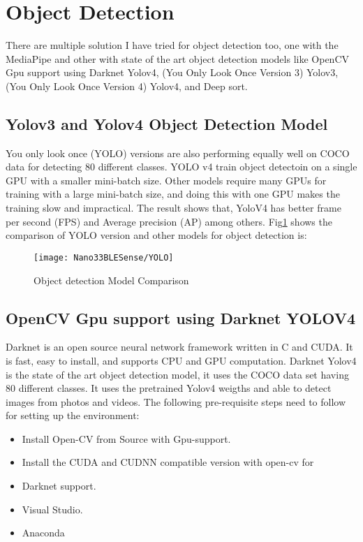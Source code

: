 \section {Object Detection}
There are multiple solution I have tried for object detection too, one with the MediaPipe and other with state of the art object detection models like OpenCV Gpu support using Darknet Yolov4, (You Only Look Once Version 3) Yolov3, (You Only Look Once Version 4) Yolov4, and Deep sort. 
\subsection{Yolov3 and Yolov4 Object Detection Model}
You only look once (YOLO) versions are also performing equally well on COCO data for detecting 80 different classes. YOLO v4 train object detectoin on a single GPU with a smaller mini-batch size. Other models require many GPUs for training with a large mini-batch size, and doing this with one GPU makes the training slow and impractical. The result shows that, YoloV4 has better frame per second (FPS) and Average precision (AP) among others. Fig\ref{Object detection Model Comparison} shows the comparison of YOLO version and other models for object detection is:

\begin{figure}[h]
	\centering
	\texttt{[image: Nano33BLESense/YOLO]}
	\caption{Object detection Model Comparison}
	\label{Object detection Model Comparison}
\end{figure}
\subsection{OpenCV Gpu support using Darknet YOLOV4}
Darknet is an open source neural network framework written in C and CUDA. It is fast, easy to install, and supports CPU and GPU computation. Darknet Yolov4 is the state of the art object detection model, it uses the COCO data set having 80 different classes. It uses the pretrained Yolov4 weigths and able to detect images from photos and videos. The following pre-requisite steps need to follow for setting up the environment:
\begin{itemize}
	\item Install Open-CV from Source with Gpu-support.
	\item Install the CUDA and CUDNN compatible version with open-cv for
	\item Darknet support.
	\item Visual Studio.
	\item Anaconda
\end{itemize}

